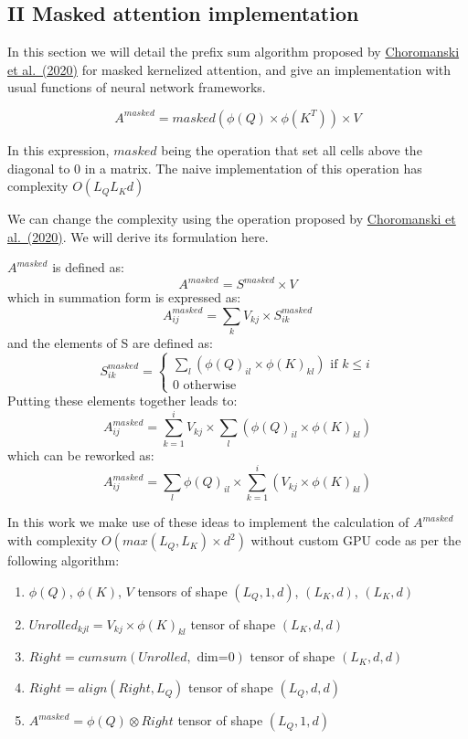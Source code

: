 \hypertarget{ii-masked-attention-implementation}{%
\subsection{II Masked attention
implementation}\label{ii-masked-attention-implementation}}

In this section we will detail the prefix sum algorithm proposed by
\href{https://arxiv.org/abs/2009.14794}{Choromanski et al.~(2020)} for
masked kernelized attention, and give an implementation with usual
functions of neural network frameworks.

\[A^{masked} = masked \left( \phi(Q) \times \phi(K^T) \right) \times V\]

In this expression, \(masked\) being the operation that set all cells
above the diagonal to 0 in a matrix. The naive implementation of this
operation has complexity \(O(L_QL_Kd)\)

We can change the complexity using the operation proposed by
\href{https://arxiv.org/abs/2009.14794}{Choromanski et al.~(2020)}. We
will derive its formulation here.

\(A^{masked}\) is defined as: \[A^{masked} = S^{masked} \times V\] which
in summation form is expressed as:
\[A^{masked}_{ij} = \sum_k V_{kj} \times S^{masked}_{ik}\] and the
elements of S are defined as: \[S^{masked}_{ik} =
\begin{cases}
    \sum_l \left( \phi(Q)_{il} \times \phi(K)_{kl} \right) \text{ if } k \leq i\\
    0 \text{ otherwise}
\end{cases}\] Putting these elements together leads to:
\[A^{masked}_{ij}= \sum_{k=1}^i V_{kj} \times \sum_l \left( \phi(Q)_{il} \times \phi(K)_{kl} \right)\]
which can be reworked as:
\[A^{masked}_{ij}= \sum_l \phi(Q)_{il} \times \sum_{k=1}^i \left( V_{kj} \times \phi(K)_{kl} \right)\]

In this work we make use of these ideas to implement the calculation of
\(A^{masked}\) with complexity \(O(max(L_Q, L_K) \times d^2)\) without
custom GPU code as per the following algorithm:

\begin{enumerate}
\def\labelenumi{\arabic{enumi}.}
\tightlist
\item
  \(\phi(Q)\), \(\phi(K)\), \(V\) tensors of shape \((L_Q, 1, d)\),
  \((L_K, d)\), \((L_K, d)\)
\item
  \(Unrolled_{kjl} = V_{kj} \times \phi(K)_{kl}\) tensor of shape
  \((L_K, d, d)\)
\item
  \(Right = cumsum(Unrolled,\text{ dim=0})\) tensor of shape
  \((L_K, d, d)\)
\item
  \(Right = align(Right, L_Q)\) tensor of shape \((L_Q, d, d)\)
\item
  \(A^{masked} = \phi(Q) \otimes Right\) tensor of shape \((L_Q, 1, d)\)
\end{enumerate}


